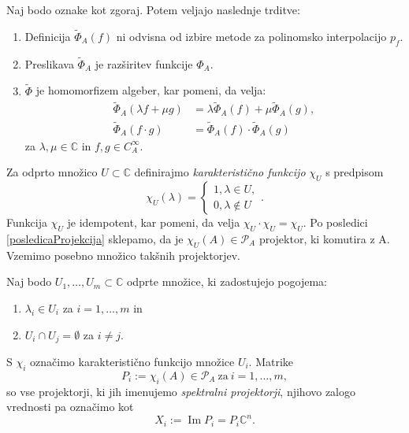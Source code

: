 \documentclass[mat1]{fmfdelo}
\newcommand{\C}{\mathbb C}
\DeclareMathOperator{\Ima}{Im}
\begin{document}
\begin{trditev} \label{trditevPhiAlgebra}
    Naj bodo oznake kot zgoraj. Potem veljajo naslednje trditve:
    \begin{enumerate}
        \item Definicija $\widetilde{\Phi}_A(f)$ ni odvisna od izbire metode za polinomsko interpolacijo $p_f$.
        \item Preslikava $\widetilde{\Phi}_A$ je razširitev funkcije $\Phi_A$.
        \item $\widetilde{\Phi}$ je homomorfizem algeber, kar pomeni, da velja:
        \begin{align*}
            \widetilde{\Phi}_A(\lambda f + \mu g) &= \lambda \widetilde{\Phi}_A(f) + \mu \widetilde{\Phi}_A(g), \\
            \widetilde{\Phi}_A(f \cdot g) &= \widetilde{\Phi}_A(f) \cdot \widetilde{\Phi}_A(g)
        \end{align*}
        za $\lambda, \mu \in \C$ in $f, g \in C_A^\infty$.
    \end{enumerate}
\end{trditev}
Za odprto množico $U \subset \C$ definirajmo \emph{karakteristično funkcijo} $\chi_U$ s predpisom
\begin{equation*}
    \chi_U(\lambda) =
    \begin{cases}
        1, \lambda \in U, \\
        0, \lambda \notin U
    \end{cases}.
\end{equation*}
Funkcija $\chi_U$ je idempotent, kar pomeni, da velja $\chi_U \cdot \chi_U = \chi_U$. Po posledici \ref{posledicaProjekcija} sklepamo, da je $\chi_U(A) \in \mathcal{P}_A$ projektor, ki komutira z A. Vzemimo posebno množico takšnih projektorjev.
\begin{definicija}\label{Uimnozice}
Naj bodo $U_1, \ldots, U_m \subset \C$ odprte množice, ki zadostujejo pogojema:
\begin{enumerate}
    \item $\lambda_i \in U_i$ za $i = 1,\ldots,m$ in
    \item $U_i \cap U_j = \emptyset$ za $i \neq j$.
\end{enumerate}
S $\chi_i$ označimo karakteristično funkcijo množice $U_i$. Matrike
\begin{equation} \label{definicijaProjekcije}
    P_i := \chi_i(A) \in \mathcal{P}_A\ \text{za}\ i = 1,\ldots, m,
\end{equation}
so vse projektorji, ki jih imenujemo \emph{spektralni projektorji}, njihovo zalogo vrednosti pa označimo kot 
\begin{equation} \label{zalogeProjekcij}
    X_i := \Ima P_i = P_i \C^n.
\end{equation}
\end{definicija}
\end{document}
